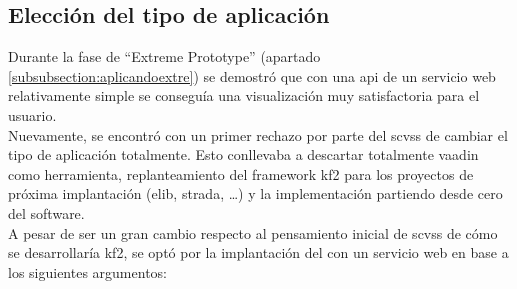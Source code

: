 \subsection{Elección del tipo de aplicación}

Durante la fase de ``Extreme Prototype'' (apartado \ref{subsubsection:aplicandoextre}) se demostró que con una \gls{api} de un servicio web relativamente simple se conseguía una visualización muy satisfactoria para el usuario.\\

Nuevamente, se encontró con un primer rechazo por parte del \gls{scvss} de cambiar el tipo de aplicación totalmente. Esto conllevaba a descartar totalmente \gls{vaadin} como herramienta, replanteamiento del \gls{framework} \gls{kf2} para los proyectos de próxima implantación (\gls{elib}, \gls{strada}, \dots) y la implementación partiendo desde cero del \gls{software}.\\

A pesar de ser un gran cambio respecto al pensamiento inicial de \gls{scvss} de cómo se desarrollaría \gls{kf2}, se optó por la implantación del  con un servicio web en base a los siguientes argumentos:

